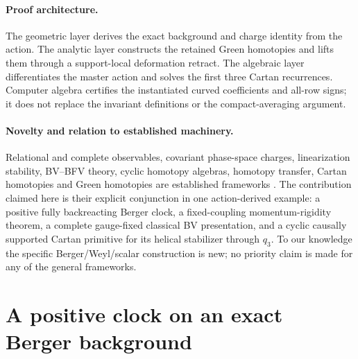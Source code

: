 \documentclass[11pt]{article}
\theoremstyle{definition}
\theoremstyle{remark}
\begin{document}
\paragraph{Proof architecture.}
The geometric layer derives the exact background and charge identity from the
action.  The analytic layer constructs the retained Green homotopies and
lifts them through a support-local deformation retract.  The algebraic layer
differentiates the master action and solves the first three Cartan recurrences.
Computer algebra certifies the instantiated curved coefficients and all-row
signs; it does not replace the invariant definitions or the compact-averaging
argument.

\paragraph{Novelty and relation to established machinery.}
Relational and complete observables, covariant phase-space charges,
linearization stability, BV--BFV theory, cyclic homotopy algebras, homotopy
transfer, Cartan homotopies and Green homotopies are established frameworks
\cite{Rovelli,Dittrich,DynamicalFrames,Khavkine,AMM,CMR,Kajiura,
HomotopyTransfer,FiorenzaManetti,GreenComplexes}.  The contribution claimed
here is their explicit conjunction in one action-derived example: a positive
fully backreacting Berger clock, a fixed-coupling momentum-rigidity theorem,
a complete gauge-fixed classical BV presentation, and a cyclic causally
supported Cartan primitive for its helical stabilizer through $q_3$.  To our knowledge the
specific Berger/Weyl/scalar construction is new; no priority claim is made
for any of the general frameworks.

\section{A positive clock on an exact Berger background}\label{sec:background}
\end{document}
